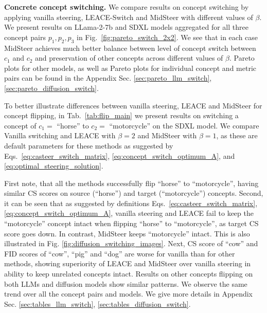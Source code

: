 \noindent \textbf{Concrete concept switching.}
We compare results on concept switching by applying vanilla steering, LEACE-Switch and MidSteer with different values of $\beta$. We present results on LLama-2-7b and SDXL models aggregated for all three concept pairs $p_1, p_2, p_3$ in Fig.~\ref{fig:pareto_switch_2x2}. We see that in each case MidSteer achieves much better balance between level of concept switch between $c_1$ and $c_2$ and preservation of other concepts across different values of $\beta$.
Pareto plots for other models, as well as Pareto plots for individual concept and metric pairs can be found in the Appendix Sec. \ref{sec:pareto_llm_switch}, \ref{sec:pareto_diffusion_switch}. 

To better illustrate differences between vanilla steering, LEACE and MidSteer for concept flipping, in Tab.~\ref{tab:flip_main} we present results on switching a concept of $c_1=$ ``horse'' to $c_2=$ ``motorcycle'' on the SDXL model. We compare Vanilla switching and LEACE with $\beta=2$ and MidSteer with $\beta=1$, as these are default parameters for these methods as suggested by Eqs.~\ref{eq:casteer_switch_matrix}, \ref{eq:concept_switch_optimum_A}, and \ref{eq:optimal_steering_solution}.

First note, that all the methods successfully flip ``horse'' to ``motorcycle'', having similar CS scores on source (``horse'') and target (``motorcycle'') concepts. Second, it can be seen that as suggested by definitions Eqs.~\ref{eq:casteer_switch_matrix}, \ref{eq:concept_switch_optimum_A}, vanilla steering and LEACE fail to keep the ``motorcycle'' concept intact when flipping ``horse'' to ``motorcycle'', as target CS score goes down. In contrast, MidSteer keeps ``motorcycle'' intact. This is also illustrated in Fig. \ref{fig:diffusion_switching_images}. Next, CS score of ``cow'' and FID scores of ``cow'', ``pig'' and ``dog'' are worse for vanilla than for other methods, showing superiority of LEACE and MidSteer over vanilla steering in ability to keep unrelated concepts intact. Results on other concepts flipping on both LLMs and diffusion models show similar patterns.
We observe the same trend over all the concept pairs and models. We give more details in Appendix Sec. \ref{sec:tables_llm_switch}, \ref{sec:tables_diffusion_switch}.





